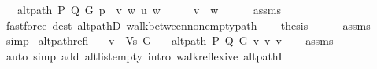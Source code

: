 \begin{isabellebody}
\ \ \ {\isachardoublequoteopen}alt{\isacharunderscore}{\kern0pt}path\ P\ Q\ G\ {\isacharparenleft}{\kern0pt}p\ {\isacharat}{\kern0pt}\ {\isacharbrackleft}{\kern0pt}v{\isacharcomma}{\kern0pt}\ w{\isacharbrackright}{\kern0pt}{\isacharparenright}{\kern0pt}\ u\ w{\isachardoublequoteclose}%
\endisataginvisible
{\isafoldinvisible}%
%
\isadeliminvisible
\isanewline
%
\endisadeliminvisible
%
\isadelimproof
%
\endisadelimproof
%
\isatagproof
{}\isamarkupfalse%
\ {\isacharminus}{\kern0pt}\isanewline
\ \ \isamarkupfalse%
\ {\isachardoublequoteopen}v{\isacharprime}{\kern0pt}\ {\isacharequal}{\kern0pt}\ w{\isachardoublequoteclose}\isanewline
\ \ \ \ \isamarkupfalse%
\ assms\isanewline
\ \ \ \ \isamarkupfalse%
\ {\isacharparenleft}{\kern0pt}fastforce\ dest{\isacharcolon}{\kern0pt}\ alt{\isacharunderscore}{\kern0pt}pathD{\isacharparenleft}{\kern0pt}{}{\isacharparenright}{\kern0pt}\ walk{\isacharunderscore}{\kern0pt}between{\isacharunderscore}{\kern0pt}nonempty{\isacharunderscore}{\kern0pt}path{\isacharparenleft}{\kern0pt}{}{\isacharparenright}{\kern0pt}{\isacharparenright}{\kern0pt}\isanewline
\ \ \isamarkupfalse%
\ {\isacharquery}{\kern0pt}thesis\isanewline
\ \ \ \ \isamarkupfalse%
\ assms\isanewline
\ \ \ \ \isamarkupfalse%
\ simp\isanewline
{}\isamarkupfalse%
%
\endisatagproof
{\isafoldproof}%
%
\isadelimproof
\isanewline
%
\endisadelimproof
%
\isadeliminvisible
\isanewline
%
\endisadeliminvisible
%
\isataginvisible
{}\isamarkupfalse%
\ alt{\isacharunderscore}{\kern0pt}path{\isacharunderscore}{\kern0pt}refl{\isacharcolon}{\kern0pt}\isanewline
\ \ \ {\isachardoublequoteopen}v\ {\isasymin}\ Vs\ G{\isachardoublequoteclose}\isanewline
\ \ \ {\isachardoublequoteopen}alt{\isacharunderscore}{\kern0pt}path\ P\ Q\ G\ {\isacharbrackleft}{\kern0pt}v{\isacharbrackright}{\kern0pt}\ v\ v{\isachardoublequoteclose}%
\endisataginvisible
{\isafoldinvisible}%
%
\isadeliminvisible
\isanewline
%
\endisadeliminvisible
%
\isadelimproof
\ \ %
\endisadelimproof
%
\isatagproof
{}\isamarkupfalse%
\ assms\isanewline
\ \ \isamarkupfalse%
\ {\isacharparenleft}{\kern0pt}auto\ simp\ add{\isacharcolon}{\kern0pt}\ alt{\isacharunderscore}{\kern0pt}list{\isacharunderscore}{\kern0pt}empty\ intro{\isacharcolon}{\kern0pt}\ walk{\isacharunderscore}{\kern0pt}reflexive\ alt{\isacharunderscore}{\kern0pt}pathI{\isacharparenright}{\kern0pt}%
\endisatagproof

\end{isabellebody}
